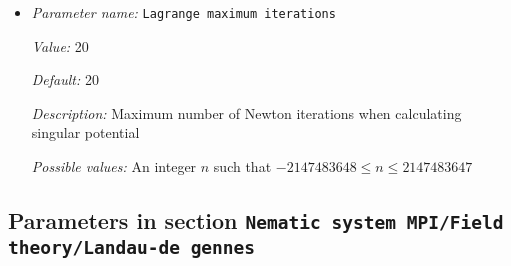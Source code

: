 \begin{itemize}
{\it Value:} 1e-10


{\it Default:} 1e-10


{\it Description:} Max L2 norm of residual from Newton's method when calculating singular potential


{\it Possible values:} A floating point number $v$ such that $-\text{MAX\_DOUBLE} \leq v \leq \text{MAX\_DOUBLE}$
\item {\it Parameter name:} {\tt Lagrange maximum iterations}
\label{parameters:Nematic system MPI/Field theory/Maier saupe/Lagrange maximum iterations}
\label{parameters:Nematic_20system_20MPI/Field_20theory/Maier_20saupe/Lagrange_20maximum_20iterations}


{\it Value:} 20


{\it Default:} 20


{\it Description:} Maximum number of Newton iterations when calculating singular potential


{\it Possible values:} An integer $n$ such that $-2147483648\leq n \leq 2147483647$
\end{itemize}

\subsection{Parameters in section \tt Nematic system MPI/Field theory/Landau-de gennes}
\label{parameters:Nematic_20system_20MPI/Field_20theory/Landau_2dde_20gennes}


